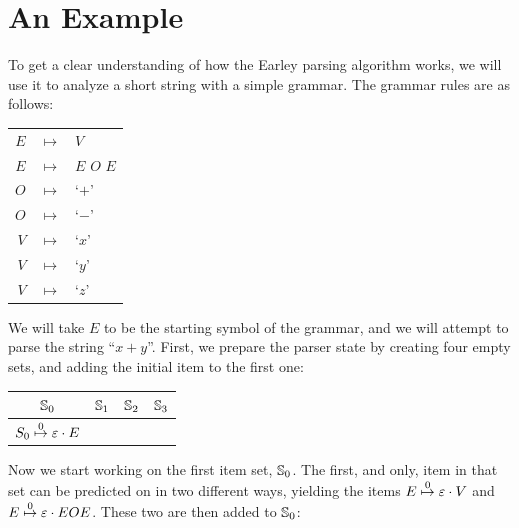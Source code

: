 	\section{An Example}


		To get a clear understanding of how the Earley parsing algorithm works,
		we will use it to analyze a short string with a simple grammar. The
		grammar rules are as follows:

		\begin{table}[h]
		\centering
		\begin{tabular}{rcl}
			$E$ & $ \mapsto $ & $V$ \\
			$E$ & $ \mapsto $ & $E$ $O$ $E$ \\
			$O$ & $ \mapsto $ & `$+$' \\
			$O$ & $ \mapsto $ & `$-$' \\
			$V$ & $ \mapsto $ & `$x$' \\
			$V$ & $ \mapsto $ & `$y$' \\
			$V$ & $ \mapsto $ & `$z$'
		\end{tabular}
		\end{table}

		We will take $E$ to be the starting symbol of the grammar, and we will
		attempt to parse the string ``$x+y$''. First, we prepare the parser
		state by creating four empty sets, and adding the initial item to the
		first one:


		\begin{table}[h]
		\centering
		\begin{tabular}{|c|c|c|c|}
			\hline
			$\St{0}$ & $\St{1}$ & $\St{2}$ & $\St{3}$ \\
			\hline
			$\earley{S_0}{\varepsilon}{E}{0}$ & & & \\
			\hline
		\end{tabular}
		\end{table}

		Now we start working on the first item set, $\St{0}$. The first, and
		only, item in that set can be predicted on in two different ways,
		yielding the items $\earley{E}{\varepsilon}{V}{0}$ and
		$\earley{E}{\varepsilon}{EOE}{0}$. These two are then added to
		$\St{0}$:

